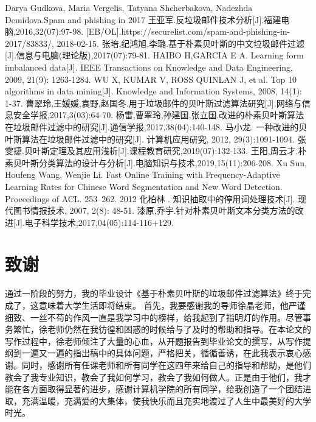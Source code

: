 \documentclass[UTF8,zihao=-4]{ctexart}
\begin{document}
\newpage
\begin{thebibliography}{99}
  \linespread{1.25}\songti{}
  Darya Gudkova, Maria Vergelis, Tatyana Shcherbakova, Nadezhda Demidova.Spam and phishing in 2017
  王亚军.反垃圾邮件技术分析[J].福建电脑,2016,32(07):97-98.
  [EB/OL].https://securelist.com/spam-and-phishing-in-2017/83833/, 2018-02-15.
   张培,纪鸿旭,李璐.基于朴素贝叶斯的中文垃圾邮件过滤[J].信息与电脑(理论版),2017(07):79-81.
   HAIBO H,GARCIA E A. Learning form imbalanced data[J]. IEEE Transactions on Knowledge and Data Engineering, 2009, 21(9):
1263-1284.
   WU X, KUMAR V, ROSS QUINLAN J, et al. Top 10 algorithms in
data mining[J]. Knowledge and Information Systems, 2008, 14(1): 1-37.
    曹翠玲,王媛媛,袁野,赵国冬.用于垃圾邮件的贝叶斯过滤算法研究[J].网络与信息安全学报,2017,3(03):64-70.
   杨雷,曹翠玲,孙建国,张立国.改进的朴素贝叶斯算法在垃圾邮件过滤中的研究[J].通信学报,2017,38(04):140-148.
   马小龙. 一种改进的贝叶斯算法在垃圾邮件过滤中的研究[J].
计算机应用研究, 2012, 29(3):1091-1094.
   张雯捷.贝叶斯定理及其应用浅析[J].课程教育研究,2019(07):132-133.
   王阳,周云才.朴素贝叶斯分类算法的设计与分析[J].电脑知识与技术,2019,15(11):206-208.
	Xu Sun, Houfeng Wang, Wenjie Li. Fast Online Training with Frequency-Adaptive Learning Rates for Chinese Word Segmentation and New Word Detection. Proceedings of ACL. 253–262. 2012
	 化柏林	. 知识抽取中的停用词处理技术[J]. 现代图书情报技术, 2007, 2(8): 48-51.	
	 漆原,乔宇.针对朴素贝叶斯文本分类方法的改进[J].电子科学技术,2017,04(05):114-116+129.
\end{thebibliography}

\newpage
\section*{致谢}
	通过一阶段的努力，我的毕业设计《基于朴素贝叶斯的垃圾邮件过滤算法》终于完成了，这意味着大学生活即将结束。
	首先，我要感谢我的导师徐晶老师，他严谨细致、一丝不苟的作风一直是我学习中的榜样，给我起到了指明灯的作用。尽管事务繁忙，徐老师仍然在我彷徨和困惑的时候给与了及时的帮助和指导。在本论文的写作过程中，徐老师倾注了大量的心血，从开题报告到毕业论文的撰写，从写作提纲到一遍又一遍的指出稿中的具体问题，严格把关，循循善诱，在此我表示衷心感谢。同时，感谢所有任课老师和所有同学在这四年来给自己的指导和帮助，是他们教会了我专业知识，教会了我如何学习，教会了我如何做人。正是由于他们，我才能在各方面取得显著的进步，感谢计算机学院的所有同学，给我创造了一个团结进取，充满温暖，充满爱的大集体，使我快乐而且充实地渡过了人生中最美好的大学时光。
	
\end{document}
